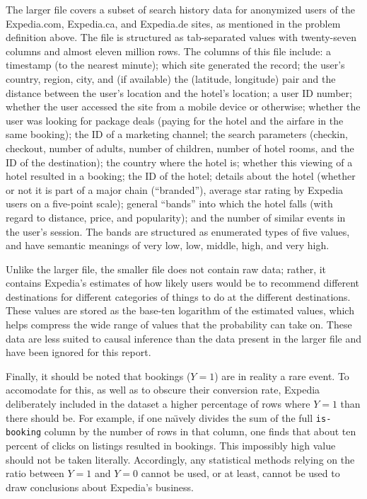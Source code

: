\documentclass{article}
\begin{document}
The larger file covers a subset of search history data for anonymized users of
the Expedia.com, Expedia.ca, and Expedia.de sites, as mentioned in the problem
definition above.  The file is structured as tab-separated values with
twenty-seven columns and almost eleven million rows.  The columns of this file
include: a timestamp (to the nearest minute); which site generated the record;
the user's country, region, city, and (if available) the (latitude, longitude)
pair and the distance between the user's location and the hotel's location; a
user ID number; whether the user accessed the site from a mobile device or
otherwise; whether the user was looking for package deals (paying for the hotel
and the airfare in the same booking); the ID of a marketing channel; the search
parameters (checkin, checkout, number of adults, number of children, number of
hotel rooms, and the ID of the destination); the country where the hotel is;
whether this viewing of a hotel resulted in a booking; the ID of the hotel;
details about the hotel (whether or not it is part of a major chain
(``branded''), average star rating by Expedia users on a five-point scale);
general ``bands'' into which the hotel falls (with regard to distance, price,
and popularity); and the number of similar events in the user's session.  The
bands are structured as enumerated types of five values, and have semantic
meanings of very low, low, middle, high, and very high.


Unlike the larger file, the smaller file does not contain raw data; rather, it
contains Expedia's estimates of how likely users would be to recommend different
destinations for different categories of things to do at the different
destinations.  These values are stored as the base-ten logarithm of the
estimated values, which helps compress the wide range of values that the
probability can take on.  These data are less suited to causal inference than
the data present in the larger file and have been ignored for this report.


Finally, it should be noted that bookings ($Y=1$) are in reality a rare event.
To accomodate for this, as well as to obscure their conversion rate, Expedia
deliberately included in the dataset a higher percentage of rows where $Y=1$
than there should be.  For example, if one na\"{\i}vely divides the sum of the
full \texttt{is-booking} column by the number of rows in that column, one finds
that about ten percent of clicks on listings resulted in bookings.  This
impossibly high value should not be taken literally.  Accordingly, any
statistical methods relying on the ratio between $Y=1$ and $Y=0$ cannot be used,
or at least, cannot be used to draw conclusions about Expedia's business.
\end{document}

